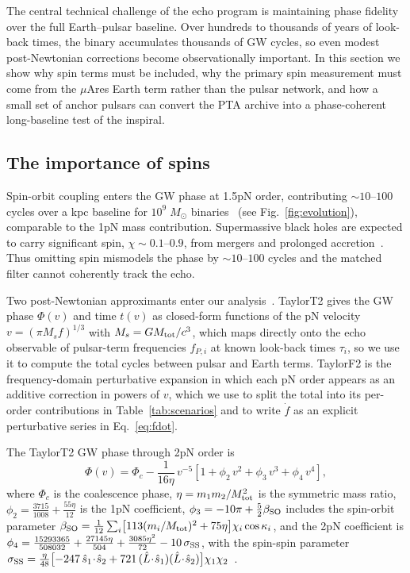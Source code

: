 \documentclass[aps,prx,twocolumn,superscriptaddress,nofootinbib,longbibliography]{revtex4-2}
\newcommand{\Msun}{M_\odot}
\begin{document}
The central technical challenge of the echo program is maintaining phase fidelity over the full Earth--pulsar baseline. Over hundreds to thousands of years of look-back times, the binary accumulates thousands of GW cycles, so even modest post-Newtonian corrections become observationally important. In this section we show why spin terms must be included, why the primary spin measurement must come from the $\mu$Ares Earth term rather than the pulsar network, and how a small set of anchor pulsars can convert the PTA archive into a phase-coherent long-baseline test of the inspiral.

\subsection{The importance of spins}

Spin-orbit coupling enters the GW phase at 1.5pN order, contributing $\sim10$--$100$ cycles over a kpc baseline for $10^9\;\Msun$ binaries~\cite{Mingarelli2012} (see Fig.~\ref{fig:evolution}), comparable to the 1pN mass contribution. Supermassive black holes are expected to carry significant spin, $\chi \sim 0.1$--$0.9$, from mergers and prolonged accretion~\cite{Reynolds2021}. Thus omitting spin mismodels the phase by $\sim10$--$100$ cycles and the matched filter cannot coherently track the echo.

Two post-Newtonian approximants enter our analysis~\cite{Blanchet2006,BIOPS2009}. TaylorT2 gives the GW phase $\Phi(v)$ and time $t(v)$ as closed-form functions of the pN velocity $v=(\pi M_s f)^{1/3}$ with $M_s = GM_{\rm tot}/c^3$, which maps directly onto the echo observable of pulsar-term frequencies $f_{P,i}$ at known look-back times $\tau_i$, so we use it to compute the total cycles between pulsar and Earth terms. TaylorF2 is the frequency-domain perturbative expansion in which each pN order appears as an additive correction in powers of $v$, which we use to split the total into its per-order contributions in Table~\ref{tab:scenarios} and to write $\dot f$ as an explicit perturbative series in Eq.~\eqref{eq:fdot}.

The TaylorT2 GW phase through 2pN order is
\begin{equation}\label{eq:phase}
  \Phi(v) = \Phi_c - \frac{1}{16\eta}\,v^{-5}
  \!\left[1 + \phi_2\,v^2 + \phi_3\,v^3 + \phi_4\,v^4\right],
\end{equation}
where $\Phi_c$ is the coalescence phase, $\eta = m_1 m_2/M_{\rm tot}^2$ is the symmetric mass ratio, $\phi_2 = \frac{3715}{1008} + \frac{55\eta}{12}$ is the 1pN coefficient, $\phi_3 = -10\pi + \frac{5}{2}\beta_{\rm SO}$ includes the spin-orbit parameter $\beta_{\rm SO} = \frac{1}{12}\sum_i \bigl[113 (m_i/M_{\rm tot})^2 + 75\eta\bigr]\chi_i\cos\kappa_i$, and the 2pN coefficient is $\phi_4 = \frac{15293365}{508032} + \frac{27145\eta}{504} + \frac{3085\eta^2}{72} - 10\,\sigma_{\rm SS}$, with the spin-spin parameter $\sigma_{\rm SS} = \frac{\eta}{48}\bigl[-247\,\hat{s}_1\!\cdot\!\hat{s}_2 + 721\,(\hat{L}\!\cdot\!\hat{s}_1)(\hat{L}\!\cdot\!\hat{s}_2)\bigr]\chi_1\chi_2$~\cite{MBMG2005}.
\end{document}
